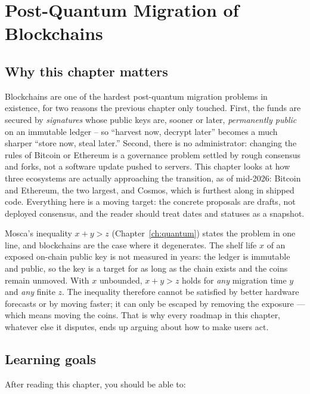 \chapter{Post-Quantum Migration of Blockchains}
\label{ch:blockchains}

\section{Why this chapter matters}
Blockchains are one of the hardest post-quantum migration problems in existence, for two reasons the previous chapter only touched. First, the funds are secured by \emph{signatures} whose public keys are, sooner or later, \emph{permanently public} on an immutable ledger -- so ``harvest now, decrypt later'' becomes a much sharper ``store now, steal later.'' Second, there is no administrator: changing the rules of Bitcoin or Ethereum is a governance problem settled by rough consensus and forks, not a software update pushed to servers. This chapter looks at how three ecosystems are actually approaching the transition, as of mid-2026: Bitcoin and Ethereum, the two largest, and Cosmos, which is furthest along in shipped code. Everything here is a moving target: the concrete proposals are drafts, not deployed consensus, and the reader should treat dates and statuses as a snapshot.

Mosca's inequality $x + y > z$ (Chapter~\ref{ch:quantum}) states the problem in
one line, and blockchains are the case where it degenerates. The shelf life $x$
of an exposed on-chain public key is not measured in years: the ledger is
immutable and public, so the key is a target for as long as the chain exists and
the coins remain unmoved. With $x$ unbounded, $x + y > z$ holds for \emph{any}
migration time $y$ and \emph{any} finite $z$. The inequality therefore cannot be
satisfied by better hardware forecasts or by moving faster; it can only be
escaped by removing the exposure --- which means moving the coins. That is why
every roadmap in this chapter, whatever else it disputes, ends up arguing about
how to make users act.

\section{Learning goals}
After reading this chapter, you should be able to:

